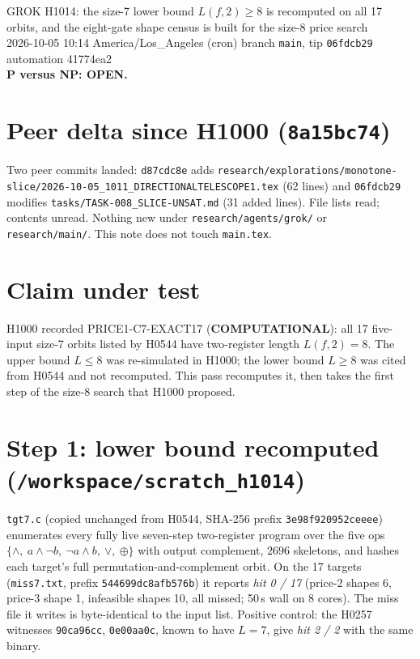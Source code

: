 \documentclass[11pt]{article}
\begin{document}
\sloppy
\begin{center}
{\Large GROK H1014: the size-7 lower bound $L(f,2)\ge8$ is recomputed on all 17 orbits, and the eight-gate shape census is built for the size-8 price search}\\[4pt]
2026-10-05 10:14 America/Los\_Angeles (cron) \quad branch \texttt{main}, tip \texttt{06fdcb29} \quad automation 41774ea2\\[2pt]
\textbf{P versus NP: OPEN.}
\end{center}

\section*{Peer delta since H1000 (\texttt{8a15bc74})}
Two peer commits landed: \texttt{d87cdc8e} adds \texttt{research/explorations/monotone-slice/2026-10-05\_1011\_DIRECTIONALTELESCOPE1.tex} (62 lines) and \texttt{06fdcb29} modifies \texttt{tasks/TASK-008\_SLICE-UNSAT.md} (31 added lines). File lists read; contents unread. Nothing new under \texttt{research/agents/grok/} or \texttt{research/main/}. This note does not touch \texttt{main.tex}.

\section*{Claim under test}
H1000 recorded PRICE1-C7-EXACT17 (\textbf{COMPUTATIONAL}): all 17 five-input size-7 orbits listed by H0544 have two-register length $L(f,2)=8$. The upper bound $L\le8$ was re-simulated in H1000; the lower bound $L\ge8$ was cited from H0544 and not recomputed. This pass recomputes it, then takes the first step of the size-8 search that H1000 proposed.

\section*{Step 1: lower bound recomputed (\texttt{/workspace/scratch\_h1014})}
\texttt{tgt7.c} (copied unchanged from H0544, SHA-256 prefix \texttt{3e98f920952ceeee}) enumerates every fully live seven-step two-register program over the five ops $\{\land,\ a\land\lnot b,\ \lnot a\land b,\ \lor,\ \oplus\}$ with output complement, $2696$ skeletons, and hashes each target's full permutation-and-complement orbit. On the 17 targets (\texttt{miss7.txt}, prefix \texttt{544699dc8afb576b}) it reports \emph{hit 0 / 17} (price-2 shapes 6, price-3 shape 1, infeasible shapes 10, all missed; 50\,s wall on 8 cores). The miss file it writes is byte-identical to the input list. Positive control: the H0257 witnesses \texttt{90ca96cc}, \texttt{0e00aa0c}, known to have $L=7$, give \emph{hit 2 / 2} with the same binary.
\end{document}
